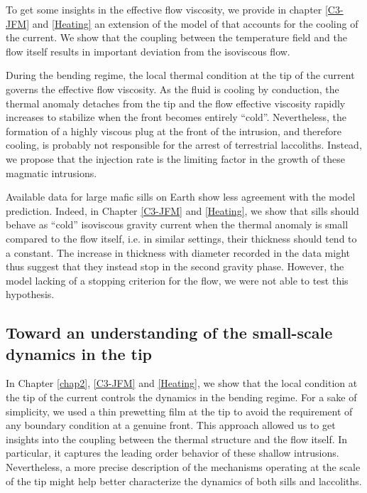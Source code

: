 To get  some insights in the  effective flow viscosity, we  provide in
chapter \ref{C3-JFM}  and \ref{Heating} an  extension of the  model of
\citet{Michaut:2011kg}   that  accounts   for  the   cooling  of   the
current. We show  that the coupling between the  temperature field and
the flow  itself results  in important  deviation from  the isoviscous
flow.

During the bending  regime, the local thermal condition at  the tip of
the current  governs the  effective flow viscosity.   As the  fluid is
cooling by conduction,  the thermal anomaly detaches from  the tip and
the flow effective  viscosity rapidly increases to  stabilize when the
front  becomes entirely  ``cold''.  Nevertheless,  the formation  of a
highly  viscous plug  at the  front  of the  intrusion, and  therefore
cooling, is  probably not  responsible for  the arrest  of terrestrial
laccoliths.   Instead,  we propose  that  the  injection rate  is  the
limiting factor in the growth of these magmatic intrusions.

Available data for large mafic sills on Earth show less agreement with
the   model  prediction.    Indeed,   in   Chapter  \ref{C3-JFM}   and
\ref{Heating}, we show that sills should behave as ``cold'' isoviscous
gravity current when the thermal anomaly is small compared to the flow
itself, i.e.   in similar settings,  their thickness should tend  to a
constant.  The  increase in  thickness with  diameter recorded  in the
data might thus  suggest that they instead stop in  the second gravity
phase.  However,  the model  lacking of a  stopping criterion  for the
flow, we were not able to test this hypothesis.



\subsection{Toward an understanding of the small-scale dynamics in the
  tip}
\label{sec:perspectives}

In Chapter  \ref{chap2}, \ref{C3-JFM} and \ref{Heating},  we show that
the local condition at the tip of the current controls the dynamics in
the  bending  regime.  For  a  sake  of  simplicity,  we used  a  thin
prewetting film  at the tip to  avoid the requirement of  any boundary
condition at a genuine front. This approach allowed us to get insights
into  the  coupling  between  the   thermal  structure  and  the  flow
itself. In particular, it captures the leading order behavior of these
shallow intrusions.   Nevertheless, a more precise  description of the
mechanisms  operating  at the  scale  of  the  tip might  help  better
characterize the dynamics of both sills and laccoliths.

